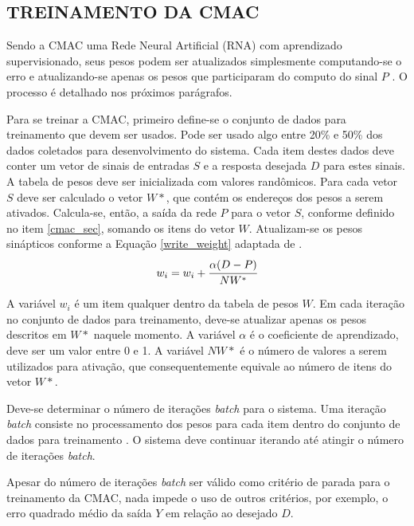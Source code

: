 \subsection{TREINAMENTO DA CMAC}
Sendo a CMAC uma Rede Neural Artificial (RNA) com aprendizado supervisionado, seus pesos podem ser atualizados simplesmente computando-se o erro e atualizando-se apenas os pesos que participaram do computo do sinal $P$ \cite{Haykin1998}. O processo é detalhado nos próximos parágrafos.

Para se treinar a CMAC, primeiro define-se o conjunto de dados para treinamento que devem ser usados. 
Pode ser usado algo entre 20\% e 50\% dos dados coletados para desenvolvimento do sistema. 
Cada item destes dados deve conter um vetor de sinais de entradas $S$ e a resposta desejada $D$ para estes sinais. 
A tabela de pesos deve ser inicializada com valores randômicos. 
Para cada vetor $S$ deve ser calculado o vetor $W*$, que contém os endereços dos pesos a serem ativados. 
Calcula-se, então, a saída da rede $P$ para o vetor $S$, conforme definido no item \ref{cmac_sec}, somando os itens do vetor $W$. 
Atualizam-se os pesos sinápticos conforme a Equação \ref{write_weight} adaptada de .
\begin{equation}
	\label{write_weight}
	w_{i} = w_{i} + \cfrac{\alpha (D - P)}{NW^{*}}
\end{equation}

A variável $w_{i}$ é um item qualquer dentro da tabela de pesos $W$. 
Em cada iteração no conjunto de dados para treinamento, deve-se atualizar apenas os pesos descritos em $W*$ naquele momento. 
A variável $\alpha$ é o coeficiente de aprendizado, deve ser um valor entre 0 e 1. 
A variável $NW*$ é o número de valores a serem utilizados para ativação, que consequentemente equivale ao número de itens do vetor $W*$.

Deve-se determinar o número de iterações \emph{batch} para o sistema. 
Uma iteração \emph{batch} consiste no processamento dos pesos para cada item dentro do conjunto de dados para treinamento \cite{Ng2015}. 
O sistema deve continuar iterando até atingir o número de iterações \emph{batch}.

Apesar do número de iterações \emph{batch} ser válido como critério de parada para o treinamento da CMAC, nada impede o uso de outros critérios, por exemplo, o erro quadrado médio da saída $Y$ em relação ao desejado $D$.
